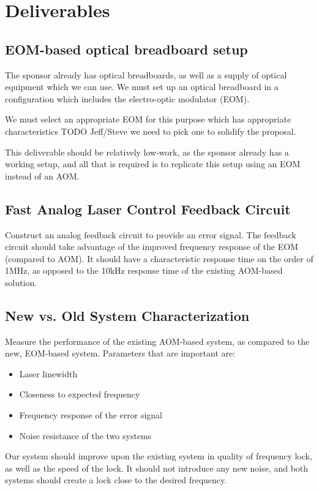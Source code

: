 \newpage
\section{Deliverables}

\subsection{EOM-based optical breadboard setup}

The sponsor already has optical breadboards, as well as a supply of optical equipment which we can use.  We must set up an optical breadboard in a configuration which includes the electro-optic modulator (EOM).

We must select an appropriate EOM for this purpose which has appropriate characteristics TODO Jeff/Steve we need to pick one to solidify the proposal.

This deliverable should be relatively low-work, as the sponsor already has a working setup, and all that is required is to replicate this setup using an EOM instead of an AOM.

\subsection{Fast Analog Laser Control Feedback Circuit}

Construct an analog feedback circuit to provide an error signal.  The feedback circuit should take advantage of the improved frequency response of the EOM (compared to AOM).  It should have a characteristic response time on the order of 1MHz, as opposed to the 10kHz response time of the existing AOM-based solution.

\subsection{New vs. Old System Characterization}

Measure the performance of the existing AOM-based system, as compared to the new, EOM-based system.  Parameters that are important are:

\begin{itemize}
    \item Laser linewidth
    \item Closeness to expected frequency
    \item Frequency response of the error signal
    \item Noise resistance of the two systems
\end{itemize}

Our system should improve upon the existing system in quality of frequency lock, as well as the speed of the lock.  It should not introduce any new noise, and both systems should create a lock close to the desired frequency.
